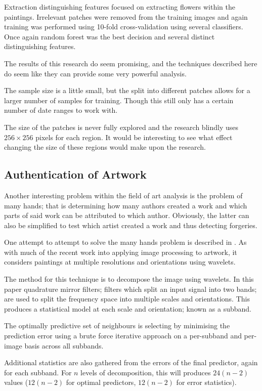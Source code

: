 \documentclass[conference]{IEEEtran}
\begin{document}
Extraction distinguishing features focused on extracting flowers within the
paintings. Irrelevant patches were removed from the training images and again
training was performed using 10-fold cross-validation using several
classifiers. Once again random forest was the best decision and several
distinct distinguishing features.

The results of this research do seem promising, and the techniques described
here do seem like they can provide some very powerful analysis.

The sample size is a little small, but the split into different patches allows
for a larger number of samples for training. Though this still only has a
certain number of date ranges to work with.

The size of the patches is never fully explored and the research blindly uses
$256 \times 256$ pixels for each region. It would be interesting to see what
effect changing the size of these regions would make upon the research.


\subsection{Authentication of Artwork}

Another interesting problem within the field of art analysis is the problem of
many hands; that is determining how many authors created a work and which parts
of said work can be attributed to which author. Obviously, the latter can also
be simplified to test which artist created a work and thus detecting forgeries.

One attempt to attempt to solve the many hands problem is described in
\cite{lyu2004digital}. As with much of the recent work into applying image
processing to artwork, it considers paintings at multiple resolutions and
orientations using wavelets.

The method for this technique is to decompose the image using wavelets. In this
paper quadrature mirror filters; filters which split an input signal into two
bands; are used to split the frequency space into multiple scales and
orientations. This produces a statistical model at each scale and orientation;
known as a subband.

The optimally predictive set of neighbours is selecting by minimising the
prediction error using a brute force iterative approach on a per-subband and
per-image basis across all subbands.

Additional statistics are also gathered from the errors of the final predictor,
again for each subband. For $n$ levels of decomposition, this will produces
$24(n-2)$ values ($12(n-2)$ for optimal predictors, $12(n-2)$ for error
statistics).
\end{document}
